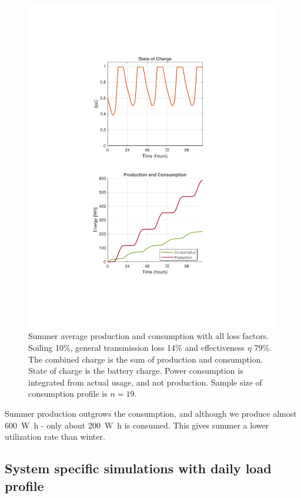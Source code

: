 \begin{figure}[H]
\begin{minipage}[t]{0.33\textwidth}
        \centering
        \includegraphics[width=\linewidth]{photos/Summer_SOC&Consumption_with_all_loss_5Days.pdf} %
    \end{minipage}
    \captionsetup{font=footnotesize}
    \caption{Summer average production and consumption with all loss factors. Soiling 10\%, general transmission loss 14\% and effectiveness $\eta$ 79\%. The combined charge is the sum of production and consumption. State of charge is the battery charge. Power consumption is integrated from actual usage, and not production. Sample size of consumption profile is $n=19$.}
    \label{result:fig:Summer_40wpp_all_losses}
\end{figure}
Summer production outgrows the consumption, and although we produce almost \SI{600}{\watt\hour} - only about \SI{200}{\watt\hour} is consumed. This gives summer a lower utilization rate than winter. 
\newpage
\subsection{System specific simulations with daily load profile}
\label{sec:systemspesificdata}
